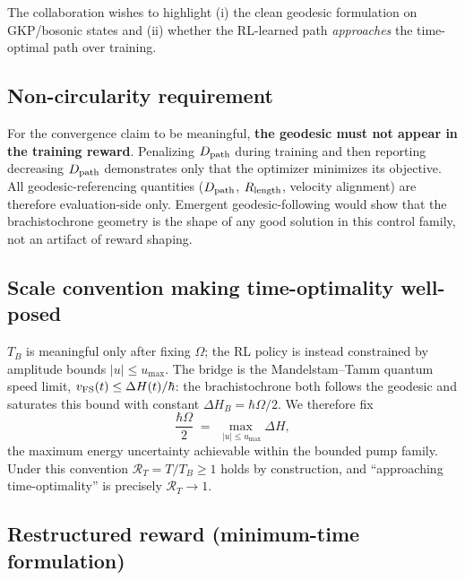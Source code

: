 \documentclass[11pt]{article}
\begin{document}
The collaboration wishes to highlight (i) the clean geodesic formulation on GKP/bosonic states and (ii) whether the RL-learned path \emph{approaches} the time-optimal path over training.

\subsection*{Non-circularity requirement}

For the convergence claim to be meaningful, \textbf{the geodesic must not appear in the training reward}. Penalizing $D_{\rm path}$ during training and then reporting decreasing $D_{\rm path}$ demonstrates only that the optimizer minimizes its objective. All geodesic-referencing quantities ($D_{\rm path}$, $R_{\rm length}$, velocity alignment) are therefore evaluation-side only. Emergent geodesic-following would show that the brachistochrone geometry is the shape of any good solution in this control family, not an artifact of reward shaping.

\subsection*{Scale convention making time-optimality well-posed}

$T_B$ is meaningful only after fixing $\Omega$; the RL policy is instead constrained by amplitude bounds $|u| \le u_{\max}$. The bridge is the Mandelstam--Tamm quantum speed limit, $v_{\rm FS}(t) \le \Delta H(t)/\hbar$: the brachistochrone both follows the geodesic and saturates this bound with constant $\Delta H_B = \hbar\Omega/2$. We therefore fix
\begin{equation}
\frac{\hbar\Omega}{2} \;=\; \max_{\,|u| \le u_{\max}} \Delta H,
\end{equation}
the maximum energy uncertainty achievable within the bounded pump family. Under this convention $\mathcal{R}_T = T/T_B \ge 1$ holds by construction, and ``approaching time-optimality'' is precisely $\mathcal{R}_T \to 1$.

\subsection*{Restructured reward (minimum-time formulation)}
\end{document}
